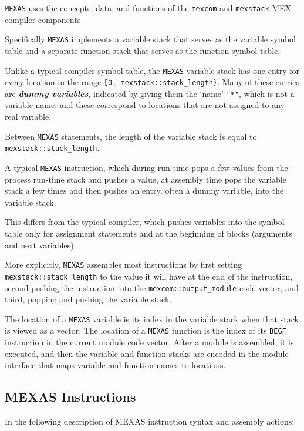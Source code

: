 \documentclass[12pt]{article}
\newcommand{\skey}[2]{{\bf \em #1#2}\index{#1}}
\newcommand{\EOL}{\penalty \exhyphenpenalty}
\begin{document}
{\tt MEXAS} uses the concepts, data, and functions of the
{\tt mexcom} and {\tt mexstack} MEX compiler components

Specifically {\tt MEXAS} implements a variable stack that serves
as the variable symbol table and a separate function stack that serves
as the function symbol table.

Unlike a typical compiler symbol table, the {\tt MEXAS} variable stack has
one entry for every location in the range {\tt [0, mexstack::stack\_length)}.
Many of these entries are \skey{dummy variable}s, indicated by
giving them the `name' {\tt "*"}, which is not a variable name,
and these correspond to locations that are not assigned to any
real variable.

Between {\tt MEXAS} statements, the length of the variable stack
is equal to {\tt mexstack::\EOL stack\_\EOL length}.

A typical {\tt MEXAS} instruction, which during run-time pops a few
values from the process run-time stack and pushes a value, at assembly
time pops the variable stack a few times and then pushes an entry,
often a dummy variable, into the variable stack.

This differs from the typical compiler, which pushes variables into
the symbol table only for assignment statements and
at the beginning of blocks (arguments and next variables).

More explicitly, {\tt MEXAS} assembles most instructions by first
setting {\tt mexstack::stack\_length} to the value it will have
at the end of the instruction, second pushing the instruction into
the {\tt mexcom::output\_module} code vector, and third, popping
and pushing the variable stack.


The location of a {\tt MEXAS} variable is its index in the
variable stack when that stack is viewed as a vector.
The location of a {\tt MEXAS} function
is the index of its {\tt BEGF} instruction in the current module
code vector.
After a module is assembled,
it is executed, and then the variable and function stacks are
encoded in the module interface that maps variable and function names
to locations.


\subsection{MEXAS Instructions}
\label{MEXAS-INSTRUCTIONS}

In the following description of MEXAS instruction syntax and
assembly actions:
\end{document}
